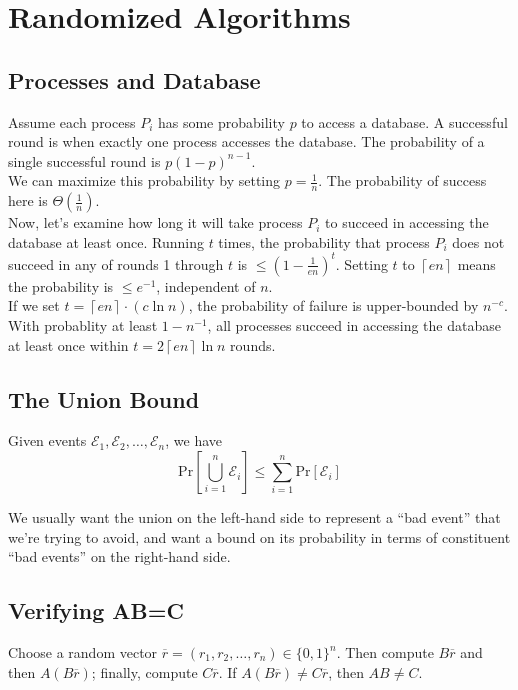 \section{Randomized Algorithms}

\subsection{Processes and Database}
Assume each process $P_i$ has some probability $p$ to access a database. A successful round is when exactly one process accesses the database. The probability of a single successful round is $p(1 - p)^{n-1}$.\\
We can maximize this probability by setting $p = \frac{1}{n}$. The probability of success here is $\Theta(\frac{1}{n})$.\\
Now, let's examine how long it will take process $P_i$ to succeed in accessing the database at least once. Running $t$ times, the probability that process $P_i$ does not succeed in any of rounds 1 through $t$ is $\leq (1 - \frac{1}{en})^t$. Setting $t$ to $\left\lceil en \right\rceil$ means the probability is $\leq e^{-1}$, independent of $n$.\\
If we set $t = \left\lceil en \right\rceil \cdot (c \ln n)$, the probability of failure is upper-bounded by $n^{-c}$.\\
With probablity at least $1 - n^{-1}$, all processes succeed in accessing the database at least once within $t = 2 \left\lceil en \right\rceil \ln n$ rounds.

\subsection{The Union Bound}
Given events $\mathscr{E}_1, \mathscr{E}_2, \ldots, \mathscr{E}_n$, we have
\[
	\text{Pr} \left[ \bigcup_{i=1}^{n} \mathscr{E}_i \right] \leq \sum_{i=1}^n \text{Pr}\left[ \mathscr{E}_i \right]
\]

We usually want the union on the left-hand side to represent a 	``bad event'' that we're trying to avoid, and want a bound on its probability in terms of constituent ``bad events'' on the right-hand side.


\subsection{Verifying AB=C}

Choose a random vector $\overline{r} = (r_1, r_2, \ldots, r_n) \in \{0, 1\}^n$. Then compute $B\overline{r}$ and then $A(B\overline{r})$; finally, compute $C\overline{r}$. If $A(B\overline{r}) \neq C\overline{r}$, then $AB \neq C$.\\


